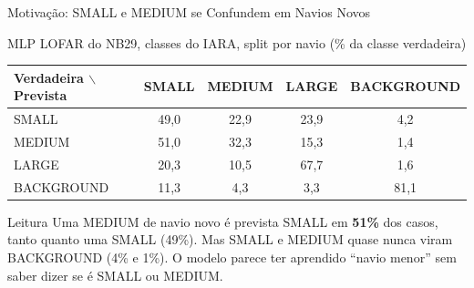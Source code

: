 \documentclass[aspectratio=169]{beamer}
\newcommand{\calo}[1]{\cellcolor{red!20}#1}
\newcommand{\camd}[1]{\cellcolor{yellow!35}#1}
\begin{document}
\begin{frame}{Motivação: SMALL e MEDIUM se Confundem em Navios Novos}
    \footnotesize
    \begin{block}{\small MLP LOFAR do NB29, classes do IARA, split por navio (\% da classe verdadeira)}
        \scriptsize
        \centering
        \setlength{\tabcolsep}{6pt}
        \begin{tabular}{lcccc}
        \toprule
        Verdadeira $\backslash$ Prevista & SMALL & MEDIUM & LARGE & BACKGROUND \\
        \midrule
        SMALL & \camd{49,0} & 22,9 & 23,9 & 4,2 \\
        MEDIUM & \calo{51,0} & 32,3 & 15,3 & 1,4 \\
        LARGE & 20,3 & 10,5 & 67,7 & 1,6 \\
        BACKGROUND & 11,3 & 4,3 & 3,3 & 81,1 \\
        \bottomrule
        \end{tabular}
    \end{block}
    \vspace{0.1cm}
    \begin{alertblock}{Leitura}
        \scriptsize
        Uma MEDIUM de navio novo é prevista SMALL em \textbf{51\%} dos casos, tanto quanto uma SMALL (49\%). Mas SMALL e MEDIUM quase nunca viram BACKGROUND (4\% e 1\%). O modelo parece ter aprendido ``navio menor'' sem saber dizer se é SMALL ou MEDIUM.
    \end{alertblock}
\end{frame}
\end{document}
